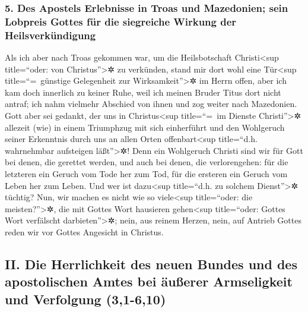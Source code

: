 \hypertarget{des-apostels-erlebnisse-in-troas-und-mazedonien-sein-lobpreis-gottes-fuxfcr-die-siegreiche-wirkung-der-heilsverkuxfcndigung}{%
\subsubsection{5. Des Apostels Erlebnisse in Troas und Mazedonien; sein
Lobpreis Gottes für die siegreiche Wirkung der
Heilsverkündigung}\label{des-apostels-erlebnisse-in-troas-und-mazedonien-sein-lobpreis-gottes-fuxfcr-die-siegreiche-wirkung-der-heilsverkuxfcndigung}}

 Als ich aber nach Troas gekommen war, um die
Heilsbotschaft Christi\textless sup title=``oder: von
Christus''\textgreater✲ zu verkünden, stand mir dort wohl eine
Tür\textless sup title=``=~günstige Gelegenheit zur
Wirksamkeit''\textgreater✲ im Herrn offen,  aber ich kam
doch innerlich zu keiner Ruhe, weil ich meinen Bruder Titus dort nicht
antraf; ich nahm vielmehr Abschied von ihnen und zog weiter nach
Mazedonien.  Gott aber sei gedankt, der uns in
Christus\textless sup title=``=~im Dienste Christi''\textgreater✲
allezeit (wie) in einem Triumphzug mit sich einherführt und den
Wohlgeruch seiner Erkenntnis durch uns an allen Orten
offenbart\textless sup title=``d.h. wahrnehmbar aufsteigen
läßt''\textgreater✲!  Denn ein Wohlgeruch Christi sind
wir für Gott bei denen, die gerettet werden, und auch bei denen, die
verlorengehen:  für die letzteren ein Geruch vom Tode her
zum Tod, für die ersteren ein Geruch vom Leben her zum Leben. Und wer
ist dazu\textless sup title=``d.h. zu solchem Dienst''\textgreater✲
tüchtig?  Nun, wir machen es nicht wie so
viele\textless sup title=``oder: die meisten?''\textgreater✲, die mit
Gottes Wort hausieren gehen\textless sup title=``oder: Gottes Wort
verfälscht darbieten''\textgreater✲; nein, aus reinem Herzen, nein, auf
Antrieb Gottes reden wir vor Gottes Angesicht in Christus.

\hypertarget{ii.-die-herrlichkeit-des-neuen-bundes-und-des-apostolischen-amtes-bei-uxe4uuxdferer-armseligkeit-und-verfolgung-31-610}{%
\subsection{II. Die Herrlichkeit des neuen Bundes und des apostolischen
Amtes bei äußerer Armseligkeit und Verfolgung
(3,1-6,10)}\label{ii.-die-herrlichkeit-des-neuen-bundes-und-des-apostolischen-amtes-bei-uxe4uuxdferer-armseligkeit-und-verfolgung-31-610}}

